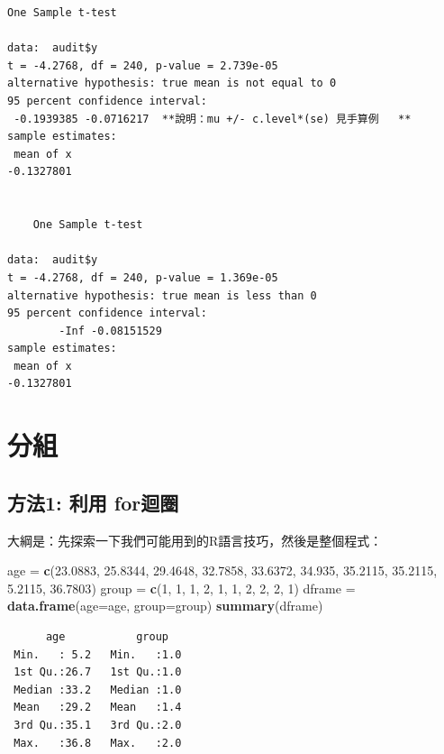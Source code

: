 \documentclass[]{book}
\newenvironment{Shaded}{\begin{snugshade}}{\end{snugshade}}
\newcommand{\DataTypeTok}[1]{\textcolor[rgb]{0.13,0.29,0.53}{#1}}
\newcommand{\DecValTok}[1]{\textcolor[rgb]{0.00,0.00,0.81}{#1}}
\newcommand{\FloatTok}[1]{\textcolor[rgb]{0.00,0.00,0.81}{#1}}
\newcommand{\KeywordTok}[1]{\textcolor[rgb]{0.13,0.29,0.53}{\textbf{#1}}}
\newcommand{\NormalTok}[1]{#1}
\newcommand{\StringTok}[1]{\textcolor[rgb]{0.31,0.60,0.02}{#1}}
\theoremstyle{definition}
\theoremstyle{definition}
\theoremstyle{definition}
\theoremstyle{remark}
\begin{document}
\begin{verbatim}
One Sample t-test

data:  audit$y
t = -4.2768, df = 240, p-value = 2.739e-05
alternative hypothesis: true mean is not equal to 0
95 percent confidence interval:
 -0.1939385 -0.0716217  **說明：mu +/- c.level*(se) 見手算例   **
sample estimates:
 mean of x 
-0.1327801 


    One Sample t-test

data:  audit$y
t = -4.2768, df = 240, p-value = 1.369e-05
alternative hypothesis: true mean is less than 0
95 percent confidence interval:
        -Inf -0.08151529
sample estimates:
 mean of x 
-0.1327801
\end{verbatim}

\section{分組}

\hypertarget{1--for}{%
\subsection{方法1: 利用 for迴圈}\label{1--for}}

大綱是：先探索一下我們可能用到的R語言技巧，然後是整個程式：

\begin{Shaded}
\begin{Highlighting}[]
\NormalTok{age    =}\StringTok{ }\KeywordTok{c}\NormalTok{(}\FloatTok{23.0883}\NormalTok{, }\FloatTok{25.8344}\NormalTok{, }\FloatTok{29.4648}\NormalTok{, }\FloatTok{32.7858}\NormalTok{, }\FloatTok{33.6372}\NormalTok{,}
           \FloatTok{34.935}\NormalTok{,  }\FloatTok{35.2115}\NormalTok{, }\FloatTok{35.2115}\NormalTok{,  }\FloatTok{5.2115}\NormalTok{, }\FloatTok{36.7803}\NormalTok{)}
\NormalTok{group  =}\StringTok{ }\KeywordTok{c}\NormalTok{(}\DecValTok{1}\NormalTok{, }\DecValTok{1}\NormalTok{, }\DecValTok{1}\NormalTok{, }\DecValTok{2}\NormalTok{, }\DecValTok{1}\NormalTok{, }\DecValTok{1}\NormalTok{, }\DecValTok{2}\NormalTok{, }\DecValTok{2}\NormalTok{, }\DecValTok{2}\NormalTok{, }\DecValTok{1}\NormalTok{)}
\NormalTok{dframe =}\StringTok{ }\KeywordTok{data.frame}\NormalTok{(}\DataTypeTok{age=}\NormalTok{age, }\DataTypeTok{group=}\NormalTok{group)}
\KeywordTok{summary}\NormalTok{(dframe)}
\end{Highlighting}
\end{Shaded}

\begin{verbatim}
      age           group    
 Min.   : 5.2   Min.   :1.0  
 1st Qu.:26.7   1st Qu.:1.0  
 Median :33.2   Median :1.0  
 Mean   :29.2   Mean   :1.4  
 3rd Qu.:35.1   3rd Qu.:2.0  
 Max.   :36.8   Max.   :2.0  
\end{verbatim}
\end{document}
